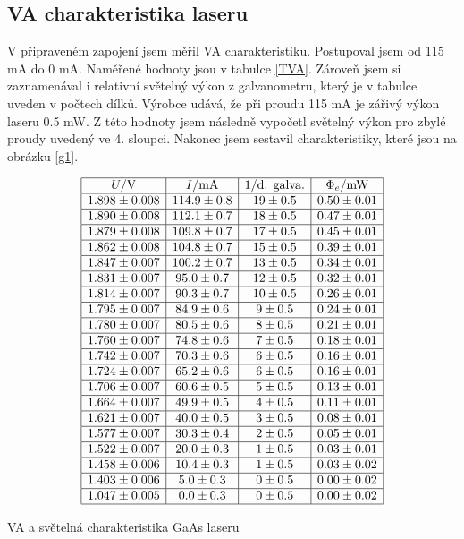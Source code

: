 \documentclass[a4paper,12pt]{article}
\begin{document}
\subsection{VA charakteristika laseru}
V připraveném zapojení jsem měřil VA charakteristiku. Postupoval jsem od 
115 mA do 0 mA. Naměřené hodnoty jsou v tabulce \ref{TVA}. Zároveň jsem si zaznamenával i relativní
 světelný výkon z galvanometru, který je v tabulce uveden v počtech dílků. Výrobce udává, že při 
 proudu 115 mA je zářivý výkon laseru 0.5 mW. Z této hodnoty jsem následně vypočetl světelný výkon pro zbylé proudy uvedený ve 4. sloupci. Nakonec jsem sestavil charakteristiky, které jsou na obrázku \ref{g1}. 
\begin{table}
$$
\begin{array}{|c|c|c|c|}
\hline
U/\mbox{V}& I/\mbox{mA}& 1/\mbox{d. galva.}  &    \Phi_e/\mbox{mW} \\ \hline 
1.898\pm 0.008&  114.9\pm 0.8&  19\pm0.5& 0.50 \pm 0.01 \\ \hline
1.890\pm 0.008&  112.1\pm 0.7&  18\pm0.5& 0.47 \pm 0.01 \\ \hline
1.879\pm 0.008&  109.8\pm 0.7&  17\pm0.5& 0.45 \pm 0.01 \\ \hline
1.862\pm 0.008&  104.8\pm 0.7&  15\pm0.5& 0.39 \pm 0.01 \\ \hline
1.847\pm 0.007&  100.2\pm 0.7&  13\pm0.5& 0.34 \pm 0.01 \\ \hline
1.831\pm 0.007&  95.0\pm 0.7&   12\pm0.5& 0.32 \pm 0.01 \\ \hline
1.814\pm 0.007&  90.3\pm 0.7&   10\pm0.5& 0.26 \pm 0.01 \\ \hline
1.795\pm 0.007&  84.9\pm 0.6&   9\pm0.5&  0.24 \pm 0.01 \\ \hline
1.780\pm 0.007&  80.5\pm 0.6&   8\pm0.5&  0.21 \pm 0.01 \\ \hline
1.760\pm 0.007&  74.8\pm 0.6&   7\pm0.5&  0.18 \pm 0.01 \\ \hline
1.742\pm 0.007&  70.3\pm 0.6&   6\pm0.5&  0.16 \pm 0.01 \\ \hline
1.724\pm 0.007&  65.2\pm 0.6&   6\pm0.5&  0.16 \pm 0.01 \\ \hline
1.706\pm 0.007&  60.6\pm 0.5&   5\pm0.5&  0.13 \pm 0.01 \\ \hline
1.664\pm 0.007&  49.9\pm 0.5&   4\pm0.5&  0.11 \pm 0.01 \\ \hline
1.621\pm 0.007&  40.0\pm 0.5& 3\pm0.5&  0.08 \pm 0.01 \\ \hline
1.577\pm 0.007&  30.3\pm 0.4&2\pm0.5   &  0.05 \pm 0.01 \\ \hline
1.522\pm 0.007&  20.0\pm 0.3& 1\pm0.5&  0.03 \pm 0.01 \\ \hline
1.458\pm 0.006&  10.4\pm 0.3&1\pm 0.5   &  0.03 \pm 0.02 \\ \hline
1.403\pm 0.006&  5.0\pm 0.3&  0\pm 0.5  &  0.00 \pm 0.02 \\ \hline
1.047\pm 0.005&  0.0\pm 0.3&  0\pm 0.5 &  0.00 \pm 0.02 \\ \hline
\end{array}
$$
\caption{VA a světelná charakteristika GaAs laseru}
\label{TVA}
\end{table}
\end{document}
